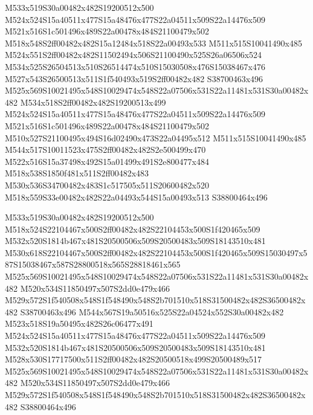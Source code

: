 \documentclass{article}
\begin{document}
\begin{multicols}{2}
M533x519S30a00482x482S19200512x500 M524x524S15a40511x477S15a48476x477S22a04511x509S22a14476x509 M521x516S1c501496x489S22a00478x484S21100479x502 M518x548S2ff00482x482S15a12484x518S22a00493x533 M511x515S10041490x485 M524x551S2ff00482x482S11502494x506S21100490x525S26a06506x524 M534x525S26504513x510S26514474x510S15030508x476S15038467x476 M527x543S26500513x511S1f540493x519S2ff00482x482 S38700463x496 M525x569S10021495x548S10029474x548S22a07506x531S22a11481x531S30a00482x482 M534x518S2ff00482x482S19200513x499 M524x524S15a40511x477S15a48476x477S22a04511x509S22a14476x509 M521x516S1c501496x489S22a00478x484S21100479x502 M510x527S21100495x494S16d02490x473S22a04495x512 M511x515S10041490x485 M544x517S10011523x475S2ff00482x482S2e500499x470 M522x516S15a37498x492S15a01499x491S2e800477x484 M518x538S1850f481x511S2ff00482x483 M530x536S34700482x483S1c517505x511S20600482x520 M518x559S33e00482x482S22a04493x544S15a00493x513 S38800464x496

M533x519S30a00482x482S19200512x500 M518x524S22104467x500S2ff00482x482S22104453x500S1f420465x509 M532x520S1814b467x481S20500506x509S20500483x509S18143510x481 M530x618S22104467x500S2ff00482x482S22104453x500S1f420465x509S15030497x587S15038467x587S28800518x565S28818461x565 M525x569S10021495x548S10029474x548S22a07506x531S22a11481x531S30a00482x482 M520x534S11850497x507S2dd0e479x466 M529x572S1f540508x548S1f548490x548S2b701510x518S31500482x482S36500482x482 S38700463x496 M544x567S19a50516x525S22a04524x552S30a00482x482 M523x518S19a50495x482S26c06477x491 M524x524S15a40511x477S15a48476x477S22a04511x509S22a14476x509 M532x520S1814b467x481S20500506x509S20500483x509S18143510x481 M528x530S17717500x511S2ff00482x482S20500518x499S20500489x517 M525x569S10021495x548S10029474x548S22a07506x531S22a11481x531S30a00482x482 M520x534S11850497x507S2dd0e479x466 M529x572S1f540508x548S1f548490x548S2b701510x518S31500482x482S36500482x482 S38800464x496


\end{multicols}
\end{document}
